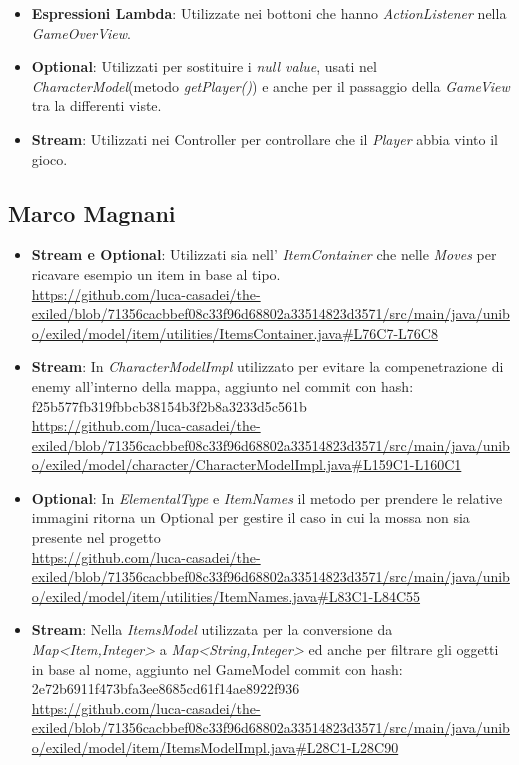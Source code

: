 \documentclass[a4paper,12pt]{report}
\begin{document}
\begin{itemize}
	\item \textbf{Espressioni Lambda}: Utilizzate nei bottoni che hanno \textit{ActionListener} nella \textit{GameOverView}.
	\item \textbf{Optional}: Utilizzati per sostituire i \textit{null value}, usati nel \textit{CharacterModel}(metodo \textit{getPlayer()}) e anche per il passaggio della \textit{GameView} tra la differenti viste.
	\item \textbf{Stream}: Utilizzati nei Controller per controllare che il \textit{Player} abbia vinto il gioco.
\end{itemize}

\subsection*{Marco Magnani}
\begin{itemize}
	\item \textbf{Stream e Optional}: Utilizzati sia nell' \textit{ItemContainer} che nelle \textit{Moves} per ricavare esempio un item in base al tipo.\\ \url{https://github.com/luca-casadei/the-exiled/blob/71356cacbbef08c33f96d68802a33514823d3571/src/main/java/unibo/exiled/model/item/utilities/ItemsContainer.java#L76C7-L76C8}
	\item \textbf{Stream}: In \textit{CharacterModelImpl} utilizzato per evitare la compenetrazione di enemy all'interno della mappa, aggiunto nel commit con hash: f25b577fb319fbbcb38154b3f2b8a3233d5c561b\\
	\url{https://github.com/luca-casadei/the-exiled/blob/71356cacbbef08c33f96d68802a33514823d3571/src/main/java/unibo/exiled/model/character/CharacterModelImpl.java#L159C1-L160C1} 
	\item \textbf{Optional}: In \textit{ElementalType} e \textit{ItemNames} il metodo per prendere le relative immagini ritorna un Optional per gestire il caso in cui la mossa non sia presente nel progetto\\
	\url{https://github.com/luca-casadei/the-exiled/blob/71356cacbbef08c33f96d68802a33514823d3571/src/main/java/unibo/exiled/model/item/utilities/ItemNames.java#L83C1-L84C55}
	\item \textbf{Stream}: Nella \textit{ItemsModel} utilizzata per la conversione da \textit{Map\textless Item,Integer\textgreater} a \textit{Map\textless String,Integer\textgreater} ed anche per filtrare gli oggetti in base al nome, aggiunto nel GameModel commit con hash: 2e72b6911f473bfa3ee8685cd61f14ae8922f936\\
	\url{https://github.com/luca-casadei/the-exiled/blob/71356cacbbef08c33f96d68802a33514823d3571/src/main/java/unibo/exiled/model/item/ItemsModelImpl.java#L28C1-L28C90}
\end{itemize}
\end{document}
